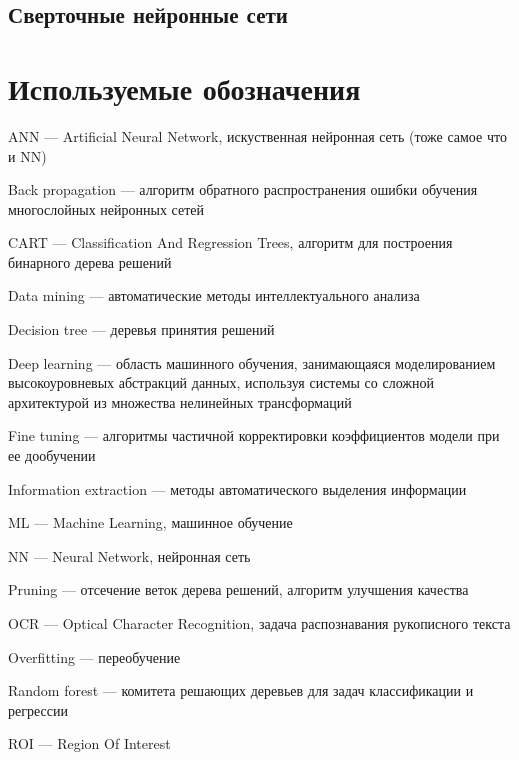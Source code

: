 \documentclass[a4paper,14pt]{extarticle} %
\begin{document}
\subsection{Сверточные нейронные сети}
\hspace{\parindent} 

\newpage
\section*{Используемые обозначения}
ANN --- Artificial Neural Network, искуственная нейронная сеть (тоже самое что и NN)

\noindent Back propagation --- алгоритм обратного распространения ошибки обучения многослойных нейронных сетей 

\noindent CART --- Classification And Regression Trees, алгоритм  для построения бинарного дерева решений

\noindent Data mining --- автоматические методы интеллектуального анализа

\noindent Decision tree --- деревья принятия решений

\noindent Deep learning --- область машинного обучения, занимающаяся моделированием высокоуровневых абстракций данных, используя системы со сложной архитектурой из множества нелинейных трансформаций

\noindent Fine tuning --- алгоритмы частичной корректировки коэффициентов модели при ее дообучении

\noindent Information extraction --- методы автоматического выделения информации

\noindent ML --- Machine Learning, машинное обучение

\noindent NN --- Neural Network, нейронная сеть

\noindent Pruning --- отсечение веток дерева решений, алгоритм улучшения качества

\noindent OCR --- Optical Character Recognition, задача распознавания рукописного текста

\noindent Overfitting --- переобучение 

\noindent Random forest --- комитета решающих деревьев для задач классификации и регрессии

\noindent ROI --- Region Of Interest 

\newpage
\begin{flushleft}
\end{flushleft}
\end{document}
